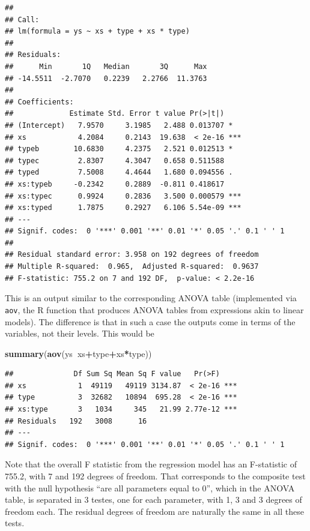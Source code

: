 \documentclass[
]{book}
\newenvironment{Shaded}{\begin{snugshade}}{\end{snugshade}}
\newcommand{\KeywordTok}[1]{\textcolor[rgb]{0.13,0.29,0.53}{\textbf{#1}}}
\newcommand{\NormalTok}[1]{#1}
\newcommand{\OperatorTok}[1]{\textcolor[rgb]{0.81,0.36,0.00}{\textbf{#1}}}
\begin{document}
\begin{verbatim}
## 
## Call:
## lm(formula = ys ~ xs + type + xs * type)
## 
## Residuals:
##      Min       1Q   Median       3Q      Max 
## -14.5511  -2.7070   0.2239   2.2766  11.3763 
## 
## Coefficients:
##             Estimate Std. Error t value Pr(>|t|)    
## (Intercept)   7.9570     3.1985   2.488 0.013707 *  
## xs            4.2084     0.2143  19.638  < 2e-16 ***
## typeb        10.6830     4.2375   2.521 0.012513 *  
## typec         2.8307     4.3047   0.658 0.511588    
## typed         7.5008     4.4644   1.680 0.094556 .  
## xs:typeb     -0.2342     0.2889  -0.811 0.418617    
## xs:typec      0.9924     0.2836   3.500 0.000579 ***
## xs:typed      1.7875     0.2927   6.106 5.54e-09 ***
## ---
## Signif. codes:  0 '***' 0.001 '**' 0.01 '*' 0.05 '.' 0.1 ' ' 1
## 
## Residual standard error: 3.958 on 192 degrees of freedom
## Multiple R-squared:  0.965,	Adjusted R-squared:  0.9637 
## F-statistic: 755.2 on 7 and 192 DF,  p-value: < 2.2e-16
\end{verbatim}

This is an output similar to the corresponding ANOVA table (implemented via \texttt{aov}, the R function that produces ANOVA tables from expressions akin to linear models). The difference is that in such a case the outputs come in terms of the variables, not their levels. This would be

\begin{Shaded}
\begin{Highlighting}[]
\KeywordTok{summary}\NormalTok{(}\KeywordTok{aov}\NormalTok{(ys}\OperatorTok{~}\NormalTok{xs}\OperatorTok{+}\NormalTok{type}\OperatorTok{+}\NormalTok{xs}\OperatorTok{*}\NormalTok{type))}
\end{Highlighting}
\end{Shaded}

\begin{verbatim}
##              Df Sum Sq Mean Sq F value   Pr(>F)    
## xs            1  49119   49119 3134.87  < 2e-16 ***
## type          3  32682   10894  695.28  < 2e-16 ***
## xs:type       3   1034     345   21.99 2.77e-12 ***
## Residuals   192   3008      16                     
## ---
## Signif. codes:  0 '***' 0.001 '**' 0.01 '*' 0.05 '.' 0.1 ' ' 1
\end{verbatim}

Note that the overall F statistic from the regression model has an F-statistic of
755.2, with
7 and
192 degrees of freedom. That corresponds to the composite test with the null hypothesis ``are all parameters equal to 0'', which in the ANOVA table, is separated in 3 testes, one for each parameter, with 1, 3 and 3 degrees of freedom each. The residual degrees of freedom are naturally the same in all these tests.
\end{document}
